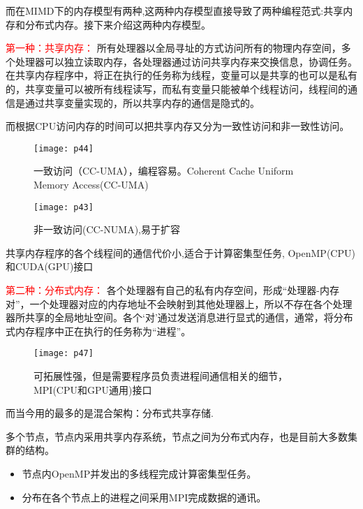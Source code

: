 \documentclass[utf8]{book}
\begin{document}
	而在MIMD下的内存模型有两种,这两种内存模型直接导致了两种编程范式:共享内存和分布式内存。接下来介绍这两种内存模型。
	
	{\Large \textcolor{red}{ 第一种：共享内存：}}
	所有处理器以全局寻址的方式访问所有的物理内存空间，多个处理器可以独立读取内存，各处理器通过访问共享内存来交换信息，协调任务。在共享内存程序中，将正在执行的任务称为线程，变量可以是共享的也可以是私有的，共享变量可以被所有线程读写，而私有变量只能被单个线程访问，线程间的通信是通过共享变量实现的，所以共享内存的通信是隐式的。
	
	而根据CPU访问内存的时间可以把共享内存又分为一致性访问和非一致性访问。
	\begin{multicols}{2}
	\begin{figure}[H]
	\centering
	\texttt{[image: p44]}
	\caption{一致访问（CC-UMA），编程容易。Coherent Cache Uniform Memory Access(CC-UMA)
	}
	\end{figure}
	
	\begin{figure}[H]
		\centering
		\texttt{[image: p43]}
		\caption{非一致访问(CC-NUMA),易于扩容}
	\end{figure}
	\end{multicols}

	共享内存程序的各个线程间的通信代价小,适合于计算密集型任务, OpenMP(CPU)和CUDA(GPU)接口
	
		{\Large \textcolor{red}{ 第二种：分布式内存：}}
	各个处理器有自己的私有内存空间，形成“处理器-内存对”，一个处理器对应的内存地址不会映射到其他处理器上，所以不存在各个处理器所共享的全局地址空间。各个‘对’通过发送消息进行显式的通信，通常，将分布式内存程序中正在执行的任务称为“进程”。

	\begin{figure}[H]
			\centering
			\texttt{[image: p47]}
			\caption{可拓展性强，但是需要程序员负责进程间通信相关的细节，MPI(CPU和GPU通用)接口}
	\end{figure}

	而当今用的最多的是混合架构：分布式共享存储.
	
	多个节点，节点内采用共享内存系统，节点之间为分布式内存，也是目前大多数集群的结构。
	\begin{itemize}
		\item 节点内OpenMP并发出的多线程完成计算密集型任务。
		\item 分布在各个节点上的进程之间采用MPI完成数据的通讯。
	\end{itemize}
\end{document}
